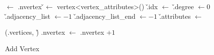 \begin{algorithm}[t]
    \small
    \SetAlgoLined


    \BlankLine
    \idx $\leftarrow$ \graph.nvertex\;
    \BlankLine
    \v $\leftarrow$ vertex<vertex\_attributes>()\;
    \v.idx $\leftarrow$ \idx\;
    \v.degree $\leftarrow 0$\;
    \v.adjacency\_list $\leftarrow -1$\;
    \v.adjacency\_list\_end $\leftarrow -1$\;
    \v.attributes $\leftarrow$ \attributes\;

    \BlankLine
    \pushback(\graph.vertices, \v)\;
    \graph.nvertex $ \leftarrow $ \graph.nvertex $ + 1$\;

    \KwRet \idx\;
    
    \caption{Add Vertex}
    \label{alg:add_vertex}
\end{algorithm}